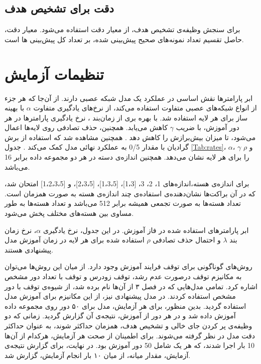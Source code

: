 \subsection{دقت برای تشخیص هدف}
برای سنجش وظیفه‌ی تشخیص هدف، از معیار دقت استفاده می‌شود. معیار دقت، حاصل تقسیم تعداد نمونه‌های صحیح پیش‌بینی شده، بر تعداد کل پیش‌بینی ها است.
\section{تنظیمات آزمایش}\noindent
ابر پارامترها نقش اساسی در عملکرد یک مدل شبکه عصبی دارند. از آن‌جا که هر جزء  از انواع شبکه‌های عصبی متفاوت استفاده می‌کند، از نرخ‌های یادگیری متفاوت $\alpha$ با بهینه ساز  \cite{adamw:Loshchilov} برای هر لایه استفاده شد.  با بهره بری از زمان‌بند ، نرخ یادگیری پارامترها در هر دور آموزش، با ضریب $\gamma$ کاهش می‌یابد. همچنین، حذف تصادفی روی لایه‌ها اعمال می‌شود، تا میزان بیش‌برازش را کاهش دهد \cite{dropout:Srivastava}. همچنین مشاهده شد که استفاده از برش گرادیان با مقدار 0/5 به عملکرد نهائی مدل کمک می‌کند \cite{clipping:mikolov}. جدول \ref{Tab:rates}، $\alpha$، $\gamma$ و $\rho$ را برای هر لایه نشان می‌دهد. همچنین اندازه‌ی دسته در هر دو مجموعه داده برابر 16 می‌باشد.


برای اندازه‌ی هسته،اندازه‌های 1، 2، 3، [1،3]، [1،3،5]، [2،3،5]، و [1،2،3،5] امتحان شد، که در آن براکت‌ها نشان‌دهنده‌ی استفاده‌ی چند اندازه‌ی هسته به صورت همزمان است. تعداد هسته‌ها به صورت تجمعی همیشه برابر 512 می‌باشد و تعداد هسته‌ها به طور مساوی بین هسته‌های مختلف پخش می‌شود.
\begin{table}[ht]
	
	\caption[ابر پارامتر‌های استفاده شده در فاز آموزش]{
		ابر پارامتر‌های استفاده شده در فاز آموزش. در این جدول، نرخ یادگیری $\alpha$، نرخ زمان بند $\lambda$ و احتمال حذف تصادفی $\rho$ استفاده شده برای هر لایه در زمان آموزش مدل پیشنهادی هستند.
	}
	\label{Tab:rates}
\end{table}


روش‌های گوناگونی برای توقف فرایند آموزش وجود دارد. از میان این روش‌ها می‌توان به مکانیزم توقف درصورت عدم رشد، توقف زودرس و توقف با تعداد دور مشخص اشاره کرد. تمامی مدل‌هایی که در فصل ۳ از آن‌ها نام برده شد، از شیوه‌ی توقف با دور مشخص استفاده کردند. در مدل پیشنهادی نیز، از این مکانیزم برای آموزش مدل استفاده گردید. بدین منظور، برای هر آزمایش، مدل برای ۵۰ دور روی مجموعه داده آموزش داده شد و در هر دور از آموزش، نتیجه‌ی آن گزارش گردید. زمانی که دو وظیفه‌ی پر کردن جای خالی و تشخیص هدف، همزمان حداکثر شوند، به عنوان حداکثر دقت مدل در نظر گرفته می‌شوند. برای اطمینان از صحت هر آزمایش، هرکدام از آن‌ها 10 بار اجرا شدند، که هر یک شامل 50 دور آموزش بود. در نهایت، برای گزارش نتیجه‌ی آزمایش، مقدار میانه، از میان ۱۰ بار انجام آزمایش، گزارش شد.


